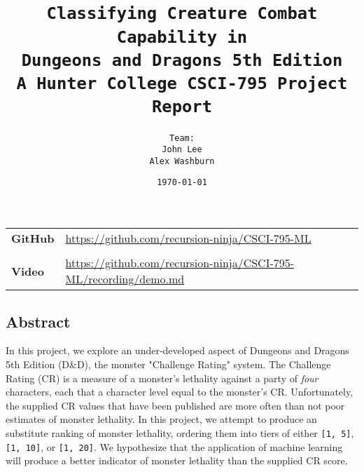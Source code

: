 \documentclass[12pt]{diazessay}
\title{\texttt{\LARGE{Classifying Creature Combat Capability in \\Dungeons and Dragons 5th Edition} \\\vspace{1em} {\large A Hunter College CSCI-795 Project Report}}} %
\author{\texttt{{\Huge Team:}\\\vspace*{-0.5em}
		John Lee \\\vspace*{-0.25em}
		Alex Washburn}} %
\date{\texttt{\today}} %
\begin{document}
	

\maketitle %

	
\pagebreak


\clearpage


\vspace*{\fill}
\begin{center}
	\begin{minipage}{.75\textwidth}
		
\tableofcontents
\vspace*{0.5cm}
\begin{longtable}[]{@{}ll@{}}
{\bfseries GitHub} & {\small \url{https://github.com/recursion-ninja/CSCI-795-ML}} \\
& \\
{\bfseries Video } & {\small \url{https://github.com/recursion-ninja/CSCI-795-ML/recording/demo.md}} \\
\end{longtable}
		
	\end{minipage}
\end{center}
\vfill %
\clearpage


\pagebreak


\clearpage
\vspace*{\fill}
\begin{center}
	\begin{minipage}{.9\textwidth}
\hypertarget{abstract}{%
\section{Abstract}\label{abstract}}

In this project, we explore an under-developed aspect of Dungeons and
Dragons 5th Edition (D\&D), the monster "Challenge Rating" system. The
Challenge Rating (CR) is a measure of a monster's lethality against a
party of \emph{four} characters, each that a character level equal to
the monster's CR. Unfortunately, the supplied CR values that have been
published are more often than not poor estimates of monster lethality.
In this project, we attempt to produce an substitute ranking of monster
lethality, ordering them into tiers of either \texttt{{[}1,\ 5{]}},
\texttt{{[}1,\ 10{]}}, or \texttt{{[}1,\ 20{]}}. We hypothesize that the
application of machine learning will produce a better indicator of
monster lethality than the supplied CR score.
	\end{minipage}
\end{center}
\vfill %
\clearpage
\pagebreak
\end{document}
